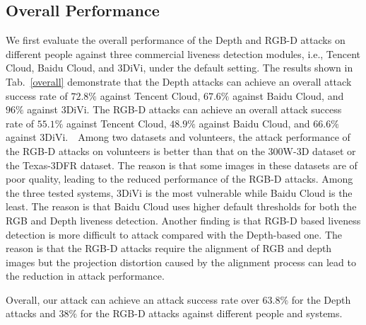 \subsection{Overall Performance}
We first evaluate the overall performance of the Depth and RGB-D attacks on different people against three commercial liveness detection modules, i.e., Tencent Cloud, Baidu Cloud, and 3DiVi, under the default setting. 
The results shown in Tab.~\ref{overall} demonstrate that the Depth attacks can achieve an overall attack success rate of $72.8\%$ against Tencent Cloud, $67.6\%$ against Baidu Cloud, and $96\%$ against 3DiVi. The RGB-D attacks can achieve an overall attack success rate of $55.1\%$ against Tencent Cloud, $48.9\%$ against Baidu Cloud, and $66.6\%$ against 3DiVi.  Among two datasets and volunteers, the attack performance of the RGB-D attacks on volunteers is better than that on the 300W-3D dataset or the Texas-3DFR dataset. The reason is that some images in these  datasets are of poor quality, leading to the reduced performance of the RGB-D attacks. 
Among the three tested systems, 3DiVi is the most vulnerable while Baidu Cloud is the least. The reason is that Baidu Cloud uses higher default thresholds for both the RGB and Depth liveness detection. 
Another finding is that RGB-D based liveness detection is more difficult to attack compared with the Depth-based one. The reason is that the RGB-D attacks require the alignment of RGB and depth images but the projection distortion caused by the alignment process can lead to the reduction in attack performance.

Overall, our attack can achieve an attack success rate  over $63.8\%$ for the Depth attacks and $38\%$ for the RGB-D attacks against different people and systems.





